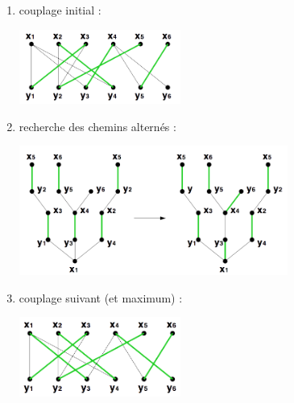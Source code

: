 \begin{myexem}
  \noindent
  \begin{enumerate}
    \item couplage initial :\\
      \begin{center}
        \includegraphics[width=150pt]{../img/hongrois1}
      \end{center}
    \item recherche des chemins alternés :\\
      \begin{center}
        \includegraphics[width=250pt]{../img/hongrois2}
      \end{center}
    \item couplage suivant (et maximum) :\\
      \begin{center}
        \includegraphics[width=150pt]{../img/hongrois3}
      \end{center}
  \end{enumerate}
\end{myexem}
